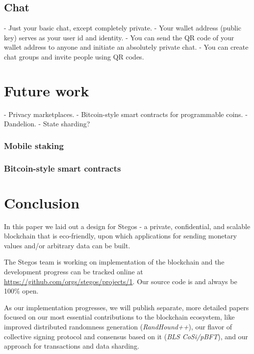\documentclass[a4paper, 10pt, conference]{ieeeconf}
\begin{document}
\subsection{Chat}\label{Chat}

- Just your basic chat, except completely private. 
- Your wallet address (public key) serves as your user id and identity. 
- You can send the QR code of your wallet address to anyone and initiate an absolutely private chat.
- You can create chat groups and invite people using QR codes.

\section{Future work}\label{FutureWork}

- Privacy marketplaces.
- Bitcoin-style smart contracts for programmable coins.
- Dandelion.
- State sharding?

\subsubsection{Mobile staking}\label{MobileStaking}

\subsubsection{Bitcoin-style smart contracts}\label{SmartContracts}

\section{Conclusion}
In this paper we laid out a design for Stegos - a private, confidential, and scalable blockchain that is eco-friendly, upon which applications for sending monetary values and/or arbitrary data can be built.

The Stegos team is working on implementation of the blockchain and the development progress can be tracked online at \url{https://github.com/orgs/stegos/projects/1}. Our source code is and always be 100\% open.

As our implementation progresses, we will publish separate, more detailed papers focused on our most essential contributions to the blockchain ecosystem, like improved distributed randomness generation (\textit{RandHound++}), our flavor of collective signing protocol and consensus based on it (\textit{BLS CoSi/pBFT}), and our approach for transactions and data sharding. 
\end{document}
